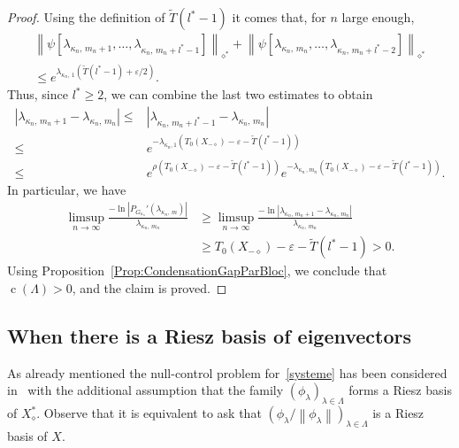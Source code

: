 \documentclass[10pt]{amsart}
\theoremstyle{definition}\newtheorem{defi}[theo]{Definition}\newtheorem{rema}[theo]{Remark}\newtheorem{exam}[theo]{Example}\newtheorem{exem}[theo]{Example}\newtheorem{nota}[theo]{Notation}
\newcommand{\Xalphas}{X_\diamond^*}
\newcommand{\Xmalpha}{X_{-\diamond}}
\newcommand{\normeX}[1]{\left\| #1 \right\|}
\newcommand{\normeXalphas}[1]{\left\| #1 \right\|_{\diamond^*}}
\DeclareMathOperator{\cond}{c}
\begin{document}
\begin{proof}
Using the definition of $\widetilde{T}(l^*-1)$ it comes that, for $n$ large enough,
\begin{multline*}
\normeXalphas{ \psi[\lambda_{\kappa_n,\,m_n+1},\dots,\lambda_{\kappa_n,\,m_n+l^*-1}] } + \normeXalphas{ \psi[\lambda_{\kappa_n,\,m_n},\dots,\lambda_{\kappa_n,\,m_n+l^*-2}] } \\
\leq e^{\lambda_{\kappa_n,\,1} \left(\widetilde{T}(l^*-1) + \varepsilon/2\right)}.
\end{multline*}
Thus, since $l^*\geq 2$, we can combine the last two estimates to obtain
\begin{equation*}
\begin{aligned}
\left| \lambda_{\kappa_n,\,m_n+1} - \lambda_{\kappa_n,\,m_n} \right| \leq & \left| \lambda_{\kappa_n,\,m_n+l^*-1} - \lambda_{\kappa_n,\,m_n} \right| \\
\leq & e^{-\lambda_{\kappa_n,1} \left(T_0(\Xmalpha)-\varepsilon - \widetilde{T}(l^*-1)\right)}\\
\leq & e^{\rho\left(T_0(\Xmalpha)-\varepsilon - \widetilde{T}(l^*-1)\right)} e^{-\lambda_{\kappa_n\,,m_n} \left(T_0(\Xmalpha)-\varepsilon - \widetilde{T}(l^*-1)\right)}.
\end{aligned}
\end{equation*}
In particular, we have
\begin{align*}
\limsup_{n \to \infty} \frac{-\ln |P_{G_{\kappa_n}}'(\lambda_{\kappa_n,\,m}) |}{\lambda_{\kappa_n,\,m_n}}& \geq \limsup_{n \to \infty} \frac{-\ln |\lambda_{\kappa_n,\,m_n+1} - \lambda_{\kappa_n,\,m_n}|}{\lambda_{\kappa_n,\,m_n}} \\
& \geq T_0(\Xmalpha)-\varepsilon - \widetilde{T}(l^*-1) > 0.
\end{align*}
Using Proposition~\ref{Prop:CondensationGapParBloc}, we conclude that $\cond(\Lambda)>0$, and the claim is proved.
\end{proof}



\subsection{When there is a Riesz basis of eigenvectors} \label{Subsec:BaseRiesz}


As already mentioned the null-control problem for~\eqref{systeme} has been considered in~\cite{AmmarKhodjaBenabdallahGonzalez-BurgosdeTeresa:2014} with the additional assumption that the family $(\phi_\lambda)_{\lambda\in \Lambda}$ forms a Riesz basis of $\Xalphas$. Observe that it is equivalent to ask that $(\phi_\lambda/\normeX{\phi_\lambda})_{\lambda\in \Lambda}$ is a Riesz basis of $X$.
\end{document}
